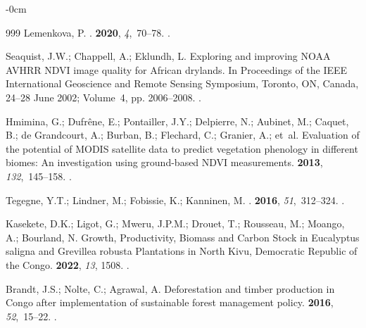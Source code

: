\documentclass[applsci,article,accept,pdftex,moreauthors]{Definitions/mdpi}
\begin{document}
\begin{adjustwidth}{-\extralength}{0cm}
\begin{thebibliography}{999}
Lemenkova, P.
.
 {\bf 2020}, {\em 4},~70--78.
.

Seaquist, J.W.; Chappell, A.; Eklundh, L.
\newblock Exploring and improving NOAA AVHRR NDVI image quality for African
  drylands.
\newblock In Proceedings of the IEEE International Geoscience and Remote
  Sensing Symposium,  {Toronto, ON, Canada, 24--28 June 2002;}   Volume~4, pp. 2006--2008.
.

Hmimina, G.; Dufrêne, E.; Pontailler, J.Y.; Delpierre, N.; Aubinet, M.;
  Caquet, B.; {de Grandcourt}, A.; Burban, B.; Flechard, C.; Granier, A.;
  et~al.
\newblock Evaluation of the potential of MODIS satellite data to predict
  vegetation phenology in different biomes: An investigation using ground-based
  NDVI measurements.
 {\bf 2013}, {\em 132},~145--158.
.

Tegegne, Y.T.; Lindner, M.; Fobissie, K.; Kanninen, M.
.
 {\bf 2016}, {\em 51},~312--324.
.

Kasekete, D.K.; Ligot, G.; Mweru, J.P.M.; Drouet, T.; Rousseau, M.; Moango, A.;
  Bourland, N.
\newblock Growth, Productivity, Biomass and Carbon Stock in Eucalyptus saligna
  and Grevillea robusta Plantations in North Kivu, Democratic Republic of the
  Congo.
 {\bf 2022}, {\em 13}, 1508.
.

Brandt, J.S.; Nolte, C.; Agrawal, A.
\newblock Deforestation and timber production in Congo after implementation of
  sustainable forest management policy.
 {\bf 2016}, {\em 52},~15--22.
.


\end{thebibliography}
\end{adjustwidth}
\end{document}

